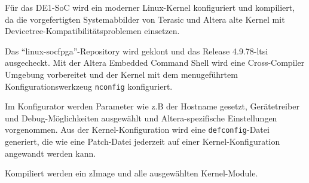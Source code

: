Für das DE1-SoC wird ein moderner Linux-Kernel konfiguriert und kompiliert, da die vorgefertigten Systemabbilder von Terasic und Altera alte Kernel mit Devicetree-Kompatibilitätsproblemen einsetzen.

Das \enquote{linux-socfpga}-Repository \cite{website:linux_socfpga_repository} wird geklont und das Release 4.9.78-ltsi ausgecheckt.
Mit der Altera Embedded Command Shell \cite[14]{manual:using_linux_on_de1_soc} wird eine Cross-Compiler Umgebung vorbereitet und der Kernel mit dem menugeführtem Konfigurationswerkzeug \texttt{nconfig} konfiguriert. 

Im Konfigurator werden  Parameter wie z.B der Hostname gesetzt, Gerätetreiber und Debug-Möglichkeiten ausgewählt und  Altera-spezifische Einstellungen vorgenommen. Aus der Kernel-Konfiguration wird eine \texttt{defconfig}-Datei generiert, die wie eine Patch-Datei jederzeit auf einer Kernel-Konfiguration angewandt werden kann. 

Kompiliert werden ein zImage und alle ausgewählten Kernel-Module.

%
%
%
%


